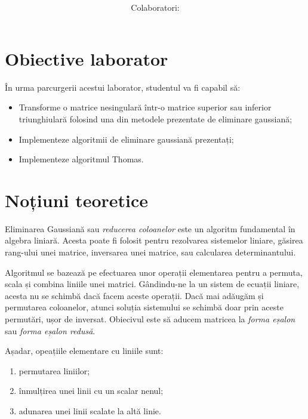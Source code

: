 \documentclass{exam}
\title{
	\textmd{\textbf{\MNLabTitle}}
	\author{Colaboratori: \MNAuthor}
}
\begin{document}
\begin{coverpages}

	\maketitle
	\thispagestyle{empty}
	\tableofcontents

\end{coverpages}

\section{Obiective laborator}

\par În urma parcurgerii acestui laborator, studentul va fi capabil să:
\begin{itemize}
	\item Transforme o matrice nesingulară într-o matrice superior sau inferior triunghiulară folosind una din metodele prezentate de eliminare gaussiană;
	\item Implementeze algoritmii de eliminare gaussiană prezentați;
	\item Implementeze algoritmul Thomas.
\end{itemize}

\section{Noțiuni teoretice}

\par Eliminarea Gaussiană sau \textit{reducerea coloanelor} este un algoritm
fundamental în algebra liniară. Acesta poate fi folosit pentru rezolvarea
sistemelor liniare, găsirea rang-ului unei matrice, inversarea unei matrice,
sau calcularea determinantului.

\par Algoritmul se bazează pe efectuarea unor operații elementarea pentru a
permuta, scala și combina liniile unei matrici. Gândindu-ne la un sistem de
ecuații liniare, acesta nu se schimbă dacă facem aceste operații. Dacă mai
adăugăm și permutarea coloanelor, atunci soluția sistemului se schimbă doar prin
aceste permutări, ușor de inversat. Obiecivul este să aducem matricea la
\textit{forma eșalon} sau \textit{forma eșalon redusă}.

\par Așadar, opeațiile elementare cu liniile sunt:

\begin{enumerate}
	\item permutarea liniilor;
	\item înmulțirea unei linii cu un scalar nenul;
	\item adunarea unei linii scalate la altă linie.
\end{enumerate}
\end{document}
